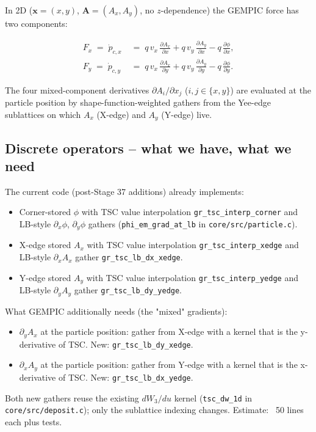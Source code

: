 \documentclass[11pt,a4paper]{article}
\newcommand{\vv}[1]{\mathbf{#1}}
\begin{document}
In 2D ($\vv{x} = (x, y)$, $\vv{A} = (A_x, A_y)$, no $z$-dependence)
the GEMPIC force has two components:
\begin{eqbox}
\begin{align}
F_x \;=\; \dot{p}_{c,x} &\;=\; q\,v_x\,\frac{\partial A_x}{\partial x}
                    + q\,v_y\,\frac{\partial A_y}{\partial x}
                    - q\,\frac{\partial \phi}{\partial x},
                    \label{eq:gempic_Fx}\\
F_y \;=\; \dot{p}_{c,y} &\;=\; q\,v_x\,\frac{\partial A_x}{\partial y}
                    + q\,v_y\,\frac{\partial A_y}{\partial y}
                    - q\,\frac{\partial \phi}{\partial y}.
                    \label{eq:gempic_Fy}
\end{align}
\end{eqbox}
The four mixed-component derivatives $\partial A_i / \partial x_j$
($i, j \in \{x, y\}$) are evaluated at the particle position by
shape-function-weighted gathers from the Yee-edge sublattices on
which $A_x$ (X-edge) and $A_y$ (Y-edge) live.

\subsection{Discrete operators -- what we have, what we need}

The current code (post-Stage 37 additions) already implements:
\begin{itemize}
  \item Corner-stored $\phi$ with TSC value interpolation
    \texttt{gr\_tsc\_interp\_corner} and LB-style $\partial_x \phi$,
    $\partial_y \phi$ gathers
    (\texttt{phi\_em\_grad\_at\_lb} in \texttt{core/src/particle.c}).
  \item X-edge stored $A_x$ with TSC value interpolation
    \texttt{gr\_tsc\_interp\_xedge} and LB-style $\partial_x A_x$
    gather \texttt{gr\_tsc\_lb\_dx\_xedge}.
  \item Y-edge stored $A_y$ with TSC value interpolation
    \texttt{gr\_tsc\_interp\_yedge} and LB-style $\partial_y A_y$
    gather \texttt{gr\_tsc\_lb\_dy\_yedge}.
\end{itemize}
What GEMPIC additionally needs (the "mixed" gradients):
\begin{itemize}
  \item $\partial_y A_x$ at the particle position: gather from
    X-edge with a kernel that is the y-derivative of TSC.
    New: \texttt{gr\_tsc\_lb\_dy\_xedge}.
  \item $\partial_x A_y$ at the particle position: gather from
    Y-edge with a kernel that is the x-derivative of TSC.
    New: \texttt{gr\_tsc\_lb\_dx\_yedge}.
\end{itemize}
Both new gathers reuse the existing $dW_3/du$ kernel
(\texttt{tsc\_dw\_1d} in \texttt{core/src/deposit.c}); only the
sublattice indexing changes.  Estimate: ~50 lines each plus tests.
\end{document}

